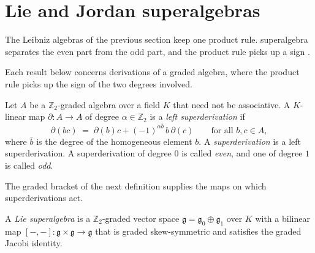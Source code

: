\section{Lie and Jordan superalgebras}\label{sec:nonassociative:superalgebras}

The Leibniz algebras of the previous section keep one product rule.
superalgebra separates the even part from the odd part, and the product rule
picks up a sign \cite[pp.~1--2]{Musson2012}.

Each result below concerns derivations of a graded algebra, where the product
rule picks up the sign of the two degrees involved. %

\begin{definition}
\label{def:nonassociative:superderivation}
Let $A$ be a $\mathbb{Z}_2$-graded algebra over a field $K$ that need
not be associative. A $K$-linear map $\partial\colon A\to A$ of degree
$\alpha\in\mathbb{Z}_2$ is a \emph{left superderivation} if
\[
\partial(bc)\;=\;\partial(b)c+(-1)^{\alpha\bar{b}}\,b\,\partial(c)
\qquad\text{for all }b,c\in A,
\]
where $\bar b$ is the degree of the homogeneous element $b$. A
\emph{superderivation} is a left superderivation. A superderivation of
degree $0$ is called \emph{even}, and one of degree $1$ is called
\emph{odd}.
\end{definition}

The graded bracket of the next definition supplies the maps on which
superderivations act.

\begin{definition}
\label{def:nonassociative:lie-super}
A \emph{Lie superalgebra} is a $\mathbb{Z}_2$-graded vector space
$\mathfrak{g}=\mathfrak{g}_0\oplus\mathfrak{g}_1$ over $K$ with a
bilinear map $[-,-]\colon\mathfrak{g}\times\mathfrak{g}\to\mathfrak{g}$
that is graded skew-symmetric and satisfies the graded Jacobi identity.
\end{definition}


